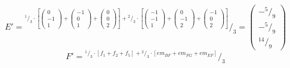 \documentclass{article}
\newcommand*\rfrac[2]{{}^{#1}\!/_{#2}}%
\begin{document}
\[E'=\rfrac{\rfrac{1}{3}\cdot\left[
\left({\begin{array}{c} 0 \\  -1 \\ 1 \end{array}}\right)+
\left({\begin{array}{c} -1 \\  0 \\ 1 \end{array}}\right)+
\left({\begin{array}{c} 0 \\  0 \\ 2 \end{array}}\right)\right]+
\rfrac{2}{3}\cdot\left[
\left({\begin{array}{c} -1 \\  -1 \\ 1 \end{array}}\right)+
\left({\begin{array}{c} 0 \\  -1 \\ 2 \end{array}}\right)+
\left({\begin{array}{c} -1 \\  0 \\ 2 \end{array}}\right)\right]
}{3}=\left({\begin{array}{c} -\rfrac{5}{9} \\  -\rfrac{5}{9} \\ \rfrac{14}{9} \end{array}}\right)\]
\[F'=\rfrac{\rfrac{1}{3}\cdot\left[f_1+f_2+f_5\right]+
\rfrac{2}{3}\cdot\left[em_{BF}+em_{FG}+em_{EF}\right]
}{3}\]
\end{document}
